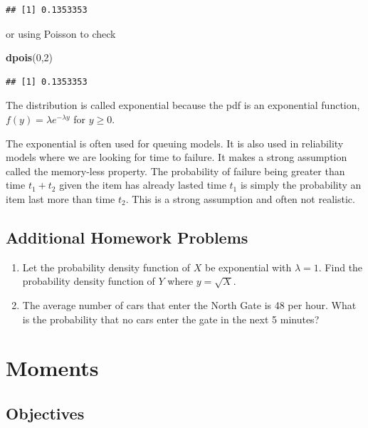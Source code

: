 \documentclass[]{book}
\newenvironment{Shaded}{\begin{snugshade}}{\end{snugshade}}
\newcommand{\KeywordTok}[1]{\textcolor[rgb]{0.13,0.29,0.53}{\textbf{#1}}}
\newcommand{\DecValTok}[1]{\textcolor[rgb]{0.00,0.00,0.81}{#1}}
\newcommand{\NormalTok}[1]{#1}
\theoremstyle{definition}
\theoremstyle{definition}
\theoremstyle{definition}
\theoremstyle{remark}
\begin{document}
\begin{verbatim}
## [1] 0.1353353
\end{verbatim}

or using Poisson to check

\begin{Shaded}
\begin{Highlighting}[]
\KeywordTok{dpois}\NormalTok{(}\DecValTok{0}\NormalTok{,}\DecValTok{2}\NormalTok{)}
\end{Highlighting}
\end{Shaded}

\begin{verbatim}
## [1] 0.1353353
\end{verbatim}

The distribution is called exponential because the pdf is an exponential
function, \(f(y)=\lambda e^{-\lambda y}\) for \(y \geq 0\).

The exponential is often used for queuing models. It is also used in
reliability models where we are looking for time to failure. It makes a
strong assumption called the memory-less property. The probability of
failure being greater than time \(t_1 + t_2\) given the item has already
lasted time \(t_1\) is simply the probability an item last more than
time \(t_2\). This is a strong assumption and often not realistic.

\subsection{Additional Homework
Problems}\label{additional-homework-problems}

\begin{enumerate}
\def\labelenumi{\arabic{enumi}.}
\item
  Let the probability density function of \(X\) be exponential with
  \(\lambda = 1\). Find the probability density function of \(Y\) where
  \(y = \sqrt{X}\).
\item
  The average number of cars that enter the North Gate is 48 per hour.
  What is the probability that no cars enter the gate in the next 5
  minutes?
\end{enumerate}

\hypertarget{L13}{\section{Moments}\label{L13}}

\subsection{Objectives}\label{objectives-12}
\end{document}
